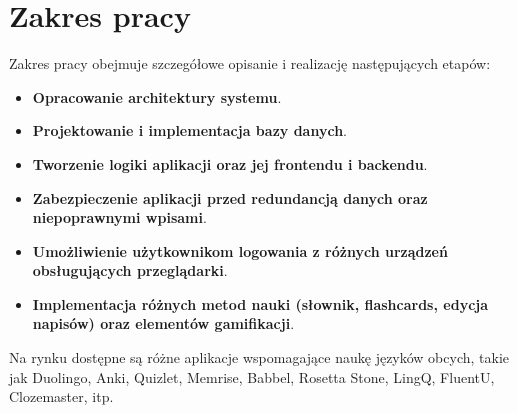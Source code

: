 \section{Zakres pracy}
Zakres pracy obejmuje szczegółowe opisanie i realizację następujących etapów:

\begin{itemize}
    \item \textbf{Opracowanie architektury systemu}.
    \item \textbf{Projektowanie i implementacja bazy danych}.
    \item \textbf{Tworzenie logiki aplikacji oraz jej frontendu i backendu}.
    \item \textbf{Zabezpieczenie aplikacji przed redundancją danych oraz niepoprawnymi wpisami}.
    \item \textbf{Umożliwienie użytkownikom logowania z różnych urządzeń obsługujących przeglądarki}.
    \item \textbf{Implementacja różnych metod nauki (słownik, flashcards, edycja napisów) oraz elementów gamifikacji}.
\end{itemize}
Na rynku dostępne są różne aplikacje wspomagające naukę języków obcych, takie jak Duolingo, Anki, Quizlet, Memrise, Babbel, Rosetta Stone, LingQ, FluentU, Clozemaster, itp.
